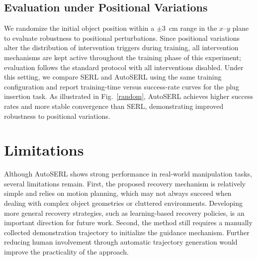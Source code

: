 \documentclass[runningheads]{llncs}
\begin{document}
\subsection{Evaluation under Positional Variations}
We randomize the initial object position within a $\pm$3~cm range in the 
$x$--$y$ plane to evaluate robustness to positional perturbations. Since 
positional variations alter the distribution of intervention triggers during 
training, all intervention mechanisms are kept active throughout the training 
phase of this experiment; evaluation follows the standard protocol with all 
interventions disabled. Under this setting, we compare SERL and AutoSERL using 
the same training configuration and report training-time versus success-rate 
curves for the plug insertion task. As illustrated in Fig.~\ref{random}, 
AutoSERL achieves higher success rates and more stable convergence than SERL, 
demonstrating improved robustness to positional variations.

\section{Limitations}
Although AutoSERL shows strong performance in real-world manipulation tasks, several limitations remain. First, the proposed recovery mechanism is relatively simple and relies on motion planning, which may not always succeed when dealing with complex object geometries or cluttered environments. Developing more general recovery strategies, such as learning-based recovery policies, is an important direction for future work. Second, the method still requires a manually collected demonstration trajectory to initialize the guidance mechanism. Further reducing human involvement through automatic trajectory generation would improve the practicality of the approach.
\end{document}
